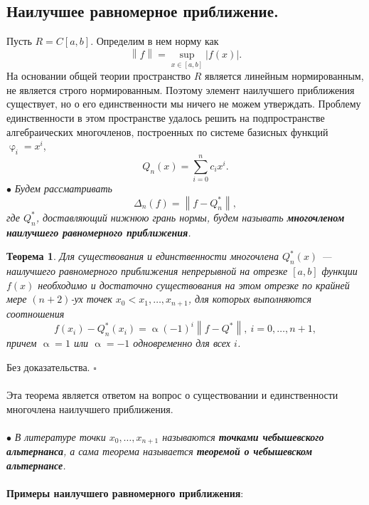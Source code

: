\documentclass[a4paper, 12pt]{report}
\numberwithin{equation}{section}
\newenvironment{Proof} %
{\par\noindent{$\blacklozenge$}} %
{\hfill$\scriptstyle\square$}
\renewcommand{\alpha}{\upalpha}
\renewcommand{\varphi}{\upvarphi}
\newcommand\Norm[1]{\left\| #1 \right\|}
\newtheorem*{theorem}{Теорема}
\begin{document}
 	\subsection{Наилучшее равномерное приближение.}
 	Пусть $R = C[a,b]$. Определим в нем норму как $$\Norm{f} = \underset{x \in [a,b]}{\sup}|f(x)|.$$
 	На основании общей теории пространство $R$ является линейным нормированным, не является строго нормированным. Поэтому элемент наилучшего приближения существует, но о его единственности мы ничего не можем утверждать. Проблему единственности в этом пространстве удалось решить на подпространстве алгебраических многочленов, построенных по системе базисных функций $\varphi_i = x^i$, $$Q_n(x) = \sum_{i=0}^{n}c_ix^i.$$
 	$\bullet$ \textit{Будем рассматривать $$\Delta_n (f) = \Norm{f - Q^*_n},$$ где $Q^*_n$, доставляющий нижнюю грань нормы, будем называть \textbf{многочленом наилучшего равномерного приближения}.}
 	\begin{theorem}
 	Для существования и единственности многочлена $Q_n^*(x)$ --- наилучшего равномерного приближения непрерывной на отрезке $[a,b]$ функции $f(x)$ необходимо и достаточно существования на этом отрезке по крайней мере $(n+2)$-ух точек $x_0<x_1,\ldots, x_{n+1}$, для которых выполняются соотношения $$f(x_i) - Q_n^*(x_i) = \alpha (-1)^i \Norm{f - Q^*},\ i = 0,\ldots, n+1,$$
 	причем $\alpha = 1$ или $\alpha = -1$ одновременно для всех $i$.
 	 	\end{theorem}
 	 	\begin{Proof}
 	 		Без доказательства.
 	 	\end{Proof}\\\\
 	 Эта теорема является ответом на вопрос о существовании и единственности многочлена наилучшего приближения. \\\\
 	 $\bullet$ \textit{В литературе точки $x_0,\ldots, x_{n+1}$ называются \textbf{точками чебышевского альтернанса}, а сама теорема называется \textbf{теоремой о чебышевском альтернансе}.}\\\\
 	 \textbf{Примеры наилучшего равномерного приближения}:
\end{document}
